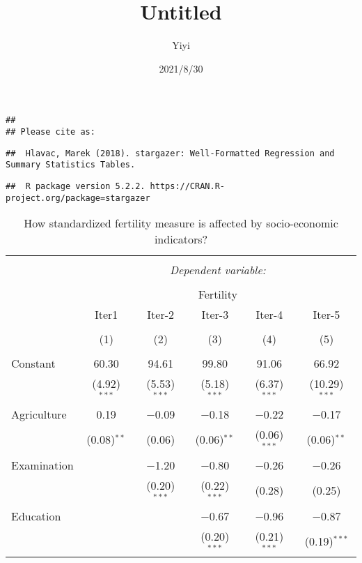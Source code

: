 \documentclass[
]{article}
\title{Untitled}
\author{Yiyi}
\date{2021/8/30}
\begin{document}
\maketitle

\begin{verbatim}
## 
## Please cite as:
\end{verbatim}

\begin{verbatim}
##  Hlavac, Marek (2018). stargazer: Well-Formatted Regression and Summary Statistics Tables.
\end{verbatim}

\begin{verbatim}
##  R package version 5.2.2. https://CRAN.R-project.org/package=stargazer
\end{verbatim}

\begin{table}[!htbp] \centering 
  \caption{How standardized fertility measure is affected by socio-economic indicators?} 
  \label{} 
\small 
\begin{tabular}{@{\extracolsep{5pt}}lccccc} 
\\[-1.8ex]\hline 
\hline \\[-1.8ex] 
 & \multicolumn{5}{c}{\textit{Dependent variable:}} \\ 
\cline{2-6} 
\\[-1.8ex] & \multicolumn{5}{c}{Fertility} \\ 
 & Iter1 & Iter-2 & Iter-3 & Iter-4 & Iter-5 \\ 
\\[-1.8ex] & (1) & (2) & (3) & (4) & (5)\\ 
\hline \\[-1.8ex] 
 Constant & 60.30 & 94.61 & 99.80 & 91.06 & 66.92 \\ 
  & (4.92)$^{***}$ & (5.53)$^{***}$ & (5.18)$^{***}$ & (6.37)$^{***}$ & (10.29)$^{***}$ \\ 
  Agriculture & 0.19 & $-$0.09 & $-$0.18 & $-$0.22 & $-$0.17 \\ 
  & (0.08)$^{**}$ & (0.06) & (0.06)$^{**}$ & (0.06)$^{***}$ & (0.06)$^{**}$ \\ 
  Examination &  & $-$1.20 & $-$0.80 & $-$0.26 & $-$0.26 \\ 
  &  & (0.20)$^{***}$ & (0.22)$^{***}$ & (0.28) & (0.25) \\ 
  Education &  &  & $-$0.67 & $-$0.96 & $-$0.87 \\ 
  &  &  & (0.20)$^{***}$ & (0.21)$^{***}$ & (0.19)$^{***}$ \\ 

\end{tabular}
\end{table}
\end{document}
